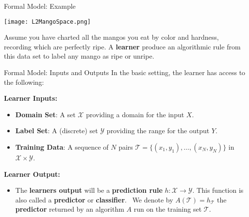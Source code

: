 \documentclass[10pt, table, handout]{beamer}
\begin{document}
\begin{frame}[fragile]{Formal Model: Example}
  \begin{minipage}[t][0.5\textheight][t]{\textwidth}
    \texttt{[image: L2MangoSpace.png]}
        \centering
  \end{minipage}
  \vfill
  \begin{minipage}[t][0.5\textheight][t]{\textwidth}
Assume you have charted all the mangos you eat by color and hardness, recording which are perfectly ripe. A \textbf{learner} produce an algorithmic rule from this data set to label any mango as ripe or unripe.  
  \end{minipage}

\end{frame}






\begin{frame}[fragile]{Formal Model: Inputs and Outputs}
In the basic setting, the learner has access to the following:

\textbf{Learner Inputs:}
\begin{itemize}[label={}]
\item\textbf{Domain Set}: A set $\mathcal{X}$ providing a domain for the input $X$.\pause

\item\textbf{Label Set}: A (discrete) set $\mathcal{Y}$ providing the range for the output $Y$.\pause

\item\textbf{Training Data}: A sequence of $N$ pairs $\mathcal{T} = \{(x_1,y_1),\ldots,(x_N,y_N)\}$ in $\mathcal{X}\times \mathcal{Y}$.
\end{itemize}
 \pause

\textbf{Learner Output:}

\begin{itemize}
\item The \textbf{learners output} will be a \textbf{prediction rule} $h:\mathcal{X}\to \mathcal{Y}$. This function is also called a \textbf{predictor} or \textbf{classifier}. \pause\, We denote by $A(\mathcal{T}) = h_{\mathcal{T}}$ the \textbf{predictor} returned by an algorithm $A$ run on the training set $\mathcal{T}$.
\end{itemize}

\end{frame}
\end{document}

